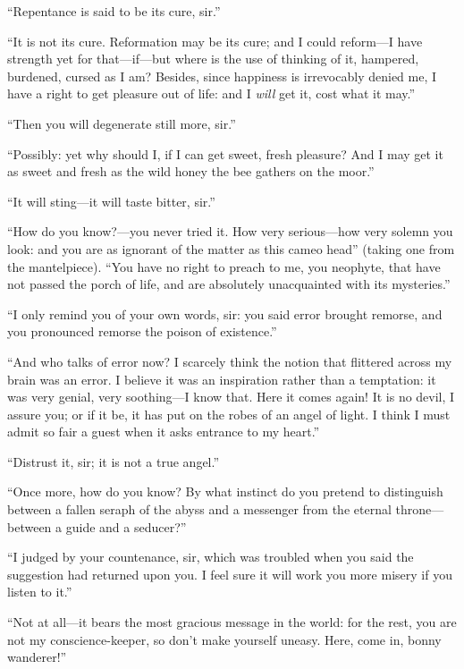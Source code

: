 \enquote{Repentance is said to be its cure, sir.}

\enquote{It is not its cure. Reformation may be its cure; and I could
	reform---I have strength yet for that---if---but where is the use of
	thinking of it, hampered, burdened, cursed as I am? Besides, since
	happiness is irrevocably denied me, I have a right to get pleasure out
	of life: and I \emph{will} get it, cost what it may.}

\enquote{Then you will degenerate still more, sir.}

\enquote{Possibly: yet why should I, if I can get sweet, fresh
	pleasure? And I may get it as sweet and fresh as the wild honey the bee
	gathers on the moor.}

\enquote{It will sting---it will taste bitter, sir.}

\enquote{How do you know?---you never tried it. How very serious---how
	very solemn you look: and you are as ignorant of the matter as this
	cameo head} (taking one from the mantelpiece). \enquote{You have no
	right to preach to me, you neophyte, that have not passed the porch of
	life, and are absolutely unacquainted with its mysteries.}

\enquote{I only remind you of your own words, sir: you said error
	brought remorse, and you pronounced remorse the poison of existence.}

\enquote{And who talks of error now? I scarcely think the notion that
	flittered across my brain was an error. I believe it was an inspiration
	rather than a temptation: it was very genial, very soothing---I know
	that. Here it comes again! It is no devil, I assure you; or if it be,
	it has put on the robes of an angel of light. I think I must admit so
	fair a guest when it asks entrance to my heart.}

\enquote{Distrust it, sir; it is not a true angel.}

\enquote{Once more, how do you know? By what instinct do you pretend to
	distinguish between a fallen seraph of the abyss and a messenger from
	the eternal throne---between a guide and a seducer?}

\enquote{I judged by your countenance, sir, which was troubled when you
	said the suggestion had returned upon you. I feel sure it will work you
	more misery if you listen to it.}

\enquote{Not at all---it bears the most gracious message in the world:
	for the rest, you are not my conscience-keeper, so don't make yourself
	uneasy. Here, come in, bonny wanderer!}

